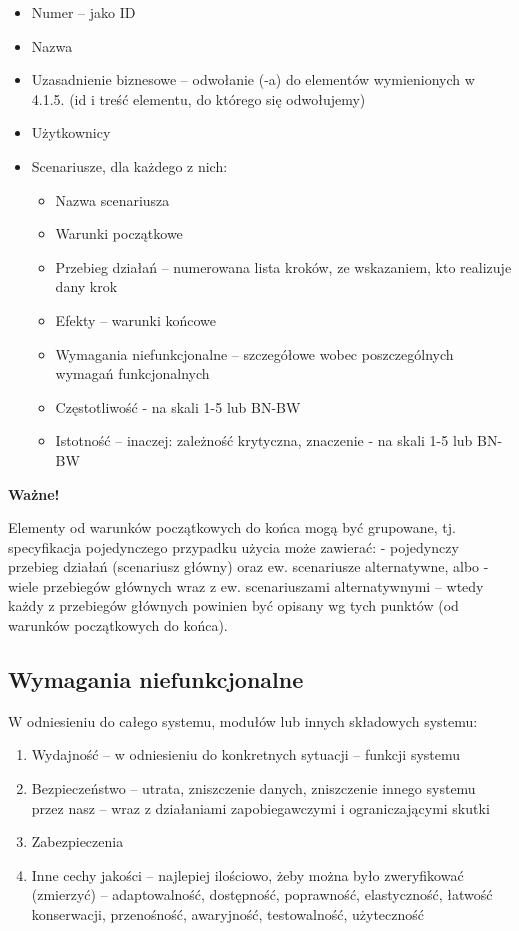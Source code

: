 \documentclass[a4paper,12pt]{article}
\begin{document}
\begin{itemize}
    \item Numer – jako ID
    \item Nazwa
    \item Uzasadnienie biznesowe – odwołanie (-a) do elementów wymienionych w 4.1.5. (id i treść elementu, do którego się odwołujemy)
    \item Użytkownicy
    \item Scenariusze, dla każdego z nich:
    \begin{itemize}
        \item Nazwa scenariusza
        \item Warunki początkowe
        \item Przebieg działań – numerowana lista kroków, ze wskazaniem, kto realizuje dany krok
        \item Efekty – warunki końcowe
        \item Wymagania niefunkcjonalne – szczegółowe wobec poszczególnych wymagań funkcjonalnych
        \item Częstotliwość - na skali 1-5 lub BN-BW
        \item Istotność – inaczej: zależność krytyczna, znaczenie - na skali 1-5 lub BN-BW
    \end{itemize}
\end{itemize}

\textbf{Ważne!}

Elementy od warunków początkowych do końca mogą być grupowane, tj. specyfikacja pojedynczego przypadku użycia może zawierać:
- pojedynczy przebieg działań (scenariusz główny) oraz ew. scenariusze alternatywne, albo
- wiele przebiegów głównych wraz z ew. scenariuszami alternatywnymi – wtedy każdy z przebiegów głównych powinien być opisany wg tych punktów (od warunków początkowych do końca).


\subsection{Wymagania niefunkcjonalne}
W odniesieniu do całego systemu, modułów lub innych składowych systemu:
\begin{enumerate}
    \item Wydajność – w odniesieniu do konkretnych sytuacji – funkcji systemu
    \item Bezpieczeństwo – utrata, zniszczenie danych, zniszczenie innego systemu przez nasz – wraz z działaniami zapobiegawczymi i ograniczającymi skutki
    \item Zabezpieczenia
    \item Inne cechy jakości – najlepiej ilościowo, żeby można było zweryfikować (zmierzyć) – adaptowalność, dostępność, poprawność, elastyczność, łatwość konserwacji, przenośność, awaryjność, testowalność, użyteczność
\end{enumerate}
\end{document}
